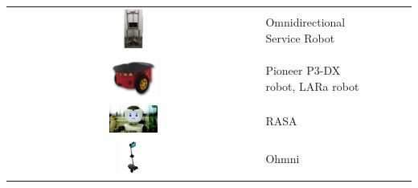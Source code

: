 \begin{table}[h]
{\begin{tabularx}{1.3\textwidth}{ c|X|X|c|c|}
\cline{2-5}
\includegraphics[width=0.08\textwidth]{robot_table/ODSR.png} & Omnidirectional Service Robot & \cite{9982640}  & \cite{9982640} & \\
\cline{2-5}
\includegraphics[width=0.2\textwidth]{robot_table/pioneer3dx.png} & Pioneer P3-DX robot, LARa robot  & \cite{8588580}  & \cite{8588580} & \\
\cline{2-5}
\includegraphics[width=0.2\textwidth]{robot_table/RASA.png} & RASA    &  & \cite{Esfandbod2023-eq} & \\
\cline{2-5}
\includegraphics[width=0.11\textwidth]{robot_table/ohmni.jpg} & Ohmni & \cite{Devaram2022-qc}  & & \\
\cline{2-5}
\end{tabularx}
}
\end{table}
\clearpage{}

